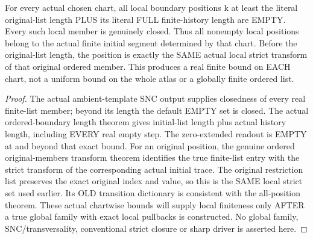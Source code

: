 \begin{theorem}
\label{hir:sharp-actual-original-birth-boundary-local-cutoff}
\leanok
For every actual chosen chart, all local boundary positions k at least the
literal original-list length PLUS its literal FULL finite-history length
are EMPTY. Every such local member is genuinely closed. Thus all nonempty local
positions belong to the actual finite
initial segment determined by that chart. Before the original-list length,
the position is exactly the SAME actual local strict transform of that
original ordered member. This produces a real finite bound on EACH chart,
not a uniform bound on the whole atlas or a globally finite ordered list.
\end{theorem}
\begin{proof}
The actual ambient-template SNC output supplies closedness of every real
finite-list member; beyond its length the default EMPTY set is closed.
The actual ordered-boundary length theorem gives initial-list length plus
actual history length, including EVERY real empty step. The zero-extended
readout is EMPTY at and beyond that exact bound. For an original position,
the genuine ordered original-members transform theorem identifies the true
finite-list entry with the strict transform of the corresponding actual
initial trace. The original restriction list preserves the exact original
index and value, so this is the SAME local strict set used earlier. Its
OLD transition dictionary is consistent with the all-position theorem.
These actual chartwise bounds will supply local finiteness only AFTER a
true global family with exact local pullbacks is constructed. No global
family, SNC/transversality, conventional strict closure or sharp driver is
asserted here.
\end{proof}
